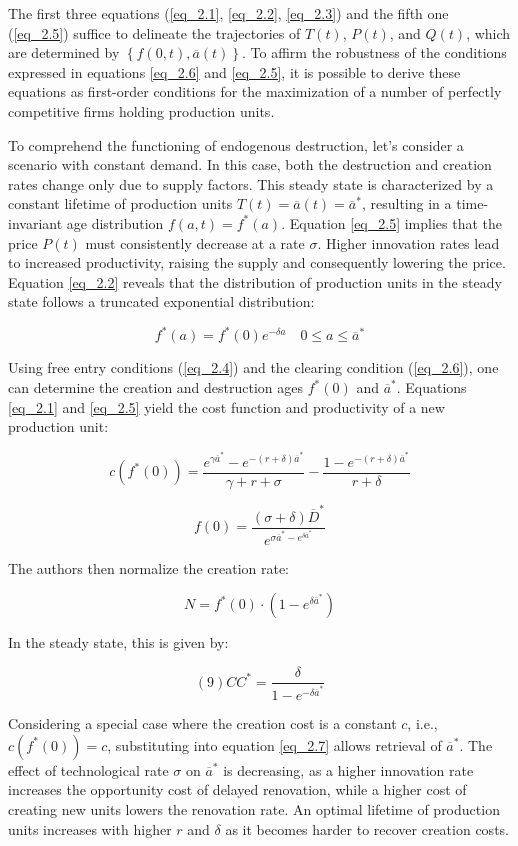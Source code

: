 \documentclass[12pt]{report}
\begin{document}
The first three equations (\ref{eq_2.1}, \ref{eq_2.2}, \ref{eq_2.3}) and the fifth one (\ref{eq_2.5}) suffice to
delineate the trajectories of \(T(t)\), \(P(t)\), and \(Q(t)\), which are determined by \(\left\{f(0,t),
\overline{a}(t)\right\}\). To affirm the robustness of the conditions expressed in equations \ref{eq_2.6} and
\ref{eq_2.5}, it is possible to derive these equations as first-order conditions for the maximization of a number of
perfectly competitive firms holding production units. 

To comprehend the functioning of endogenous destruction, let's consider a scenario with constant demand. In this case,
both the destruction and creation rates change only due to supply factors. This steady state is characterized by a
constant lifetime of production units \(T(t) = \overline{a}(t) = \overline{a}^*\), resulting in a time-invariant age
distribution \(f(a,t) = f^*(a)\). Equation \ref{eq_2.5} implies that the price \(P(t)\) must consistently decrease at a
rate \(\sigma\). Higher innovation rates lead to increased productivity, raising the supply and consequently lowering
the price. Equation \ref{eq_2.2} reveals that the distribution of production units in the steady state follows a
truncated exponential distribution: 

\[f^*(a) = f^*(0)e^{-\delta a} \quad 0 \leq a \leq \overline{a}^*\]

Using free entry conditions (\ref{eq_2.4}) and the clearing condition (\ref{eq_2.6}), one can determine the creation and
destruction ages \(f^*(0)\) and \(\overline{a}^*\). Equations \ref{eq_2.1} and \ref{eq_2.5} yield the cost function and
productivity of a new production unit: 

\[\label{eq_2.7} c(f^*(0)) = \frac{e^{\gamma \overline{a}^*} - e^{-(r + \delta)\overline{a}^*}}{\gamma + r + \sigma} - \frac{1 - e^{-(r + \delta)\overline{a}^*}}{r + \delta}\]

\[\label{eq_2.8} f(0) = \frac{(\sigma + \delta)\overline{D}^*}{e^{\sigma \overline{a}^* - e^{\delta \overline{a}^*}}}\]

The authors then normalize the creation rate:

\[N = f^*(0) \cdot (1 - e^{\delta \overline{a}^*})\]

In the steady state, this is given by:

\[(9) \label{eq2.9}CC^* = \frac{\delta}{1 - e^{-\delta \overline{a}^*}}\]

Considering a special case where the creation cost is a constant \(c\), i.e., \(c(f^*(0)) = c\), substituting into
equation \ref{eq_2.7} allows retrieval of \(\overline{a}^*\). The effect of technological rate \(\sigma\) on
\(\overline{a}^*\) is decreasing, as a higher innovation rate increases the opportunity cost of delayed renovation,
while a higher cost of creating new units lowers the renovation rate. An optimal lifetime of production units increases
with higher \(r\) and \(\delta\) as it becomes harder to recover creation costs. 
\end{document}
